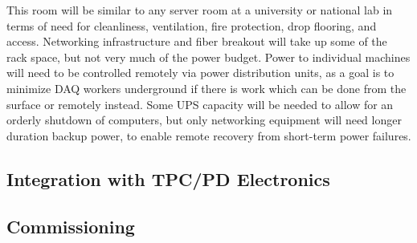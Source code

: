This room will be similar to any server room at a university or national
lab in terms of need for cleanliness, ventilation, fire protection, drop
flooring, and access.  Networking infrastructure and fiber breakout will
take up some of the rack space, but not very much of the power budget.
 Power to individual machines will need to be controlled remotely via
power distribution units, as a goal is to minimize DAQ workers
underground if there is work which can be done from the surface or
remotely instead.  Some UPS capacity will be needed to allow for an
orderly shutdown of computers, but only networking equipment will need
longer duration backup power, to enable remote recovery from short-term
power failures.  

\subsection{Integration with TPC/PD Electronics}
\label{sec:fdsp-daq-install-transport}


\subsection{Commissioning}
\label{sec:fdsp-daq-commissioning}


%


%
%
%
%
%

